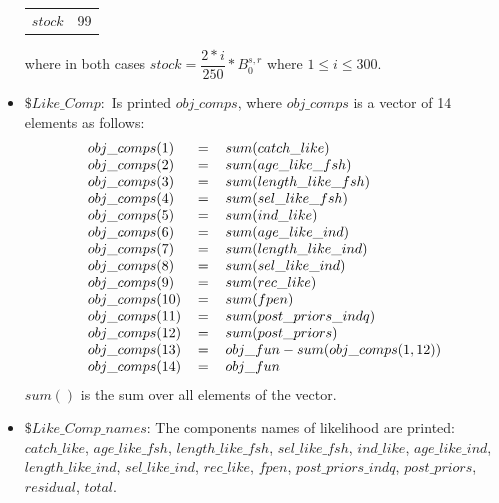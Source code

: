 \documentclass{article}
\begin{document}
\begin{itemize}
\begin{center}
    \begin{tabular}{c c}
        $stock$ &  99 \\

    \end{tabular}
\end{center}
where in both cases $stock=\dfrac{2*i}{250}*B_0^{s,r}$ where $1\leq i \leq 300$.
\item $\$ Like\_Comp:$ Is printed $obj\_comps$, where $obj\_comps$ is a vector of 14 elements as follows: 
 \begin{equation} \label{eq:obj}
     \begin{tabular}{l l l}
      $obj\_comps(1)$ &  = &  $sum(catch\_like)$  \\
      $obj\_comps(2)$ & = & $sum(age\_like\_fsh)$\\ 
      $obj\_comps(3)$  & = & $sum(length\_like\_fsh)$\\ 
$obj\_comps(4)$ &  = & $sum(sel\_like\_fsh)$\\ 
$  obj\_comps(5)$ &  = & $sum(ind\_like)$\\ 
$ obj\_comps(6)$ &  = & $sum(age\_like\_ind)$\\ 
$  obj\_comps(7)$ &  = & $sum(length\_like\_ind)$\\ 
$  obj\_comps(8)$ &  = & $sum(sel\_like\_ind)$\\ 
$  obj\_comps(9)$ &  = & $sum(rec\_like)$\\ 
$  obj\_comps(10)$ &  = & $sum(fpen)$\\ 
$  obj\_comps(11)$ &  = & $sum(post\_priors\_indq)$\\ 
 $ obj\_comps(12)$ &  = & $sum(post\_priors)$\\ 
$ obj\_comps(13)$ &  = & $obj\_fun - sum(obj\_comps(1,12))$\\ 
 $  obj\_comps(14)$ &  = & $obj\_fun $
      
 \end{tabular}
 \end{equation}
  $sum()$ is the sum over all elements of the vector.




\item $\$ Like\_Comp\_names$: The components names of likelihood are printed: $catch\_like$, $age\_like\_fsh$,  $length\_like\_fsh$, $sel\_like\_fsh$, $ind\_like $, $age\_like\_ind$, $length\_like\_ind$, $sel\_like\_ind$, $rec\_like$, $fpen$, $post\_priors\_indq$, $post\_priors$, $residual$, $total$.


\end{itemize}
\end{document}
